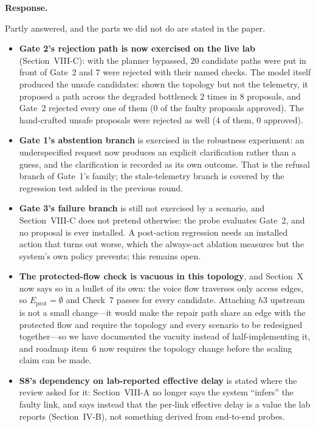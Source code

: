 \documentclass[11pt,a4paper]{article}
\newcommand{\ProbeTotal}{20}
\newcommand{\ProbeRejected}{7}
\newcommand{\ProbeTopoN}{8}
\newcommand{\ProbeTopoCross}{2}
\newcommand{\ProbeTopoFaultyApproved}{0}
\newcommand{\ProbeCraftedN}{4}
\newcommand{\ProbeCraftedApproved}{0}
\newenvironment{response}{\par\noindent\begin{minipage}{\linewidth}\small\textbf{Response.}\par}{\end{minipage}\medskip\par}
\begin{document}
\begin{response}
Partly answered, and the parts we did not do are stated in the paper.

\begin{itemize}
  \item \textbf{Gate 2's rejection path is now exercised on the live lab}
    (Section~VIII-C): with the planner bypassed, $\ProbeTotal$ candidate
    paths were put in front of Gate~2 and $\ProbeRejected$ were rejected
    with their named checks. The model itself produced the unsafe
    candidates: shown the topology but not the telemetry, it proposed a
    path across the degraded bottleneck $\ProbeTopoCross$ times in
    $\ProbeTopoN$ proposals, and Gate~2 rejected every one of them
    ($\ProbeTopoFaultyApproved$ of the faulty proposals approved). The
    hand-crafted unsafe proposals were rejected as well
    ($\ProbeCraftedN$ of them, $\ProbeCraftedApproved$ approved).
  \item \textbf{Gate 1's abstention branch} is exercised in the robustness
    experiment: an underspecified request now produces an explicit
    clarification rather than a guess, and the clarification is recorded
    as its own outcome. That is the refusal branch of Gate~1's family;
    the stale-telemetry branch is covered by the regression test added in
    the previous round.
  \item \textbf{Gate 3's failure branch} is still not exercised by a
    scenario, and Section~VIII-C does not pretend otherwise: the probe
    evaluates Gate~2, and no proposal is ever installed. A
    post-action regression needs an installed action that turns out worse,
    which the always-act ablation measures but the system's own policy
    prevents; this remains open.
  \item \textbf{The protected-flow check is vacuous in this topology}, and
    Section~X now says so in a bullet of its own: the voice flow traverses
    only access edges, so $E_{\mathrm{prot}}=\emptyset$ and Check~7
    passes for every candidate. Attaching $h3$ upstream is not a small
    change---it would make the repair path share an edge with the
    protected flow and require the topology and every scenario to be
    redesigned together---so we have documented the vacuity instead of
    half-implementing it, and roadmap item~6 now requires the topology
    change before the scaling claim can be made.
  \item \textbf{S8's dependency on lab-reported effective delay} is stated
    where the review asked for it: Section~VIII-A no longer says the
    system ``infers'' the faulty link, and says instead that the
    per-link effective delay is a value the lab reports
    (Section~IV-B), not something derived from end-to-end probes.
\end{itemize}
\end{response}
\end{document}
